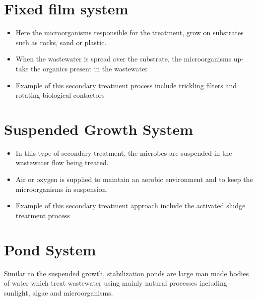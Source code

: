 \section{Fixed film system}	

\begin{itemize}
\item Here the microorganisms responsible for the treatment, grow on substrates such
as rocks, sand or plastic.
\item When the wastewater is spread over the substrate, the microorganisms up-take the organics present in the wastewater
\item Example of this secondary treatment process include trickling filters and rotating biological contactors\\
\end{itemize}

\section{Suspended Growth System}
\begin{itemize}
\item In this type of secondary treatment, the microbes are suspended in the
wastewater flow being treated. 
\item Air or oxygen is supplied to maintain an aerobic environment and to keep the microorganisms in suspension. 
\item Example of this secondary treatment approach include the activated sludge treatment process 
\end{itemize}

\section{Pond System}
Similar to the suspended growth, stabilization ponds are large man made bodies of water which treat wastewater using mainly natural processes including sunlight, algae and microorganisms.


